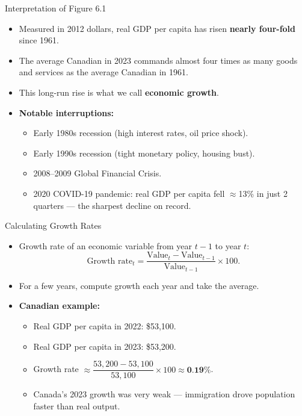 \documentclass[aspectratio=169]{beamer}
\begin{document}
\begin{frame}{Interpretation of Figure 6.1}
\transfade
\begin{itemize}[<+->]
  \item Measured in 2012 dollars, real GDP per capita has risen \textbf{nearly four-fold} since 1961.
  \item The average Canadian in 2023 commands \alert{almost four times as many} goods and services as the average Canadian in 1961.
  \item This long-run rise is what we call \textbf{economic growth}.
  \item \textbf{Notable interruptions:}
  \begin{itemize}[<+->]
    \item Early 1980s recession (high interest rates, oil price shock).
    \item Early 1990s recession (tight monetary policy, housing bust).
    \item 2008--2009 Global Financial Crisis.
    \item \alert{2020 COVID-19 pandemic}: real GDP per capita fell $\approx$13\% in just 2 quarters --- the sharpest decline on record.
  \end{itemize}
\end{itemize}
\end{frame}


\begin{frame}{Calculating Growth Rates}
\transfade
\begin{itemize}[<+->]
  \item Growth rate of an economic variable from year $t-1$ to year $t$:
  \[
    \text{Growth rate}_t = \frac{\text{Value}_t - \text{Value}_{t-1}}{\text{Value}_{t-1}} \times 100.
  \]
  \item For a few years, compute growth each year and take the average.
  \item \textbf{Canadian example:}
  \begin{itemize}[<+->]
    \item Real GDP per capita in 2022: \$53,100.
    \item Real GDP per capita in 2023: \$53,200.
    \item Growth rate $\approx \dfrac{53{,}200 - 53{,}100}{53{,}100} \times 100 \approx \textbf{0.19\%}$.
    \item \textcolor{canadared}{Canada's 2023 growth was very weak --- immigration drove population faster than real output.}
  \end{itemize}
\end{itemize}
\end{frame}
\end{document}
